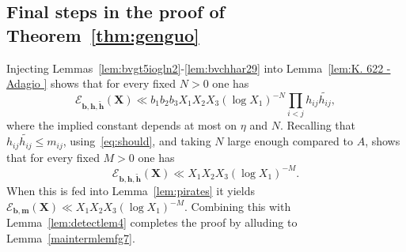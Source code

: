 \documentclass[a4paper,12pt,reqno]{amsart}
\numberwithin{equation}{section} \numberwithin{figure}{section}
\renewcommand{\b}{\mathbf}
\renewcommand{\leq}{\leqslant}
\renewcommand{\#}{\sharp}
\theoremstyle{definition}
\numberwithin{lemma}{section}
\begin{document}
\subsection{Final steps in the proof of Theorem~\ref{thm:genguo}} \label{sec:finstep}
Injecting Lemmas~\ref{lem:bvgt5iogln2}-\ref{lem:bvchhar29} into Lemma~\ref{lem:K. 622 - Adagio }  shows that for every fixed 
$N>0$ one has  \[ \mathcal{E}_{\b b, \mathbf{h}, \widetilde{\mathbf{h}}}(\b X)
\ll   b_1b_2b_3  X_1 X_2 X_3  (\log X_1)^{-N} \prod_{i<j }h_{ij} \widetilde{   h_{ij}  }  ,\] where the implied constant depends at most on  $\eta$ and $N$.
Recalling that $h_{ij} \widetilde{   h_{ij}  }\leq m_{ij}$, using~\eqref{eq:should},
and taking $N$ large enough compared to $A$, shows that  for every fixed $M>0$ one has 
 \[ \mathcal{E}_{\b b, \mathbf{h}, \widetilde{\mathbf{h}}}(\b X) \ll   X_1 X_2 X_3  (\log X_1)^{-M} .\] When this is fed into Lemma~\ref{lem:pirates} 
it yields 
$ \mathcal{E}_{\b b, \b m }(\b X) \ll X_1 X_2 X_3 (\log X_1)^{-M}$.
Combining this with Lemma~\ref{lem:detectlem4} 
completes the proof by alluding to 
Lemma~\ref{maintermlemfg7}.
  
\end{document}
